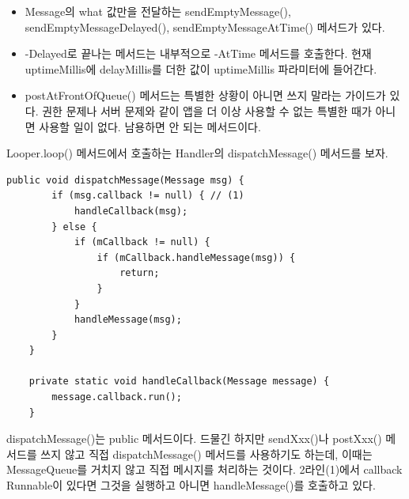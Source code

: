 \begin{itemize}
\item Message의 what 값만을 전달하는 sendEmptyMessage(), sendEmptyMessageDelayed(), sendEmptyMessageAtTime() 메서드가 있다.
\item -Delayed로 끝나는 메서드는 내부적으로 -AtTime 메서드를 호출한다. 현재 uptimeMillis에 delayMillis를 더한 값이 uptimeMillis 파라미터에 들어간다.
\item postAtFrontOfQueue() 메서드는 특별한 상황이 아니면 쓰지 말라는 가이드가 있다. 
권한 문제나 서버 문제와 같이 앱을 더 이상 사용할 수 없는 특별한 때가 아니면 사용할 일이 없다. 남용하면 안 되는 메서드이다.
\end{itemize}

Looper.loop() 메서드에서 호출하는 Handler의 dispatchMessage() 메서드를 보자.
\begin{lstlisting}[frame=single, caption=Handler.java] 
	public void dispatchMessage(Message msg) {
		if (msg.callback != null) { // (1)
			handleCallback(msg);
		} else {
			if (mCallback != null) {
				if (mCallback.handleMessage(msg)) {
					return;
				}
			}
			handleMessage(msg);
		}
	}
	
	private static void handleCallback(Message message) {
		message.callback.run();
	}
\end{lstlisting}
dispatchMessage()는 public 메서드이다. 
드물긴 하지만 sendXxx()나 postXxx() 메서드를 쓰지 않고 직접 dispatchMessage() 메서드를 사용하기도 하는데, 이때는 MessageQueue를 거치지 않고 직접 메시지를 처리하는 것이다.
2라인(1)에서 callback Runnable이 있다면 그것을 실행하고 아니면 handleMessage()를 호출하고 있다.

